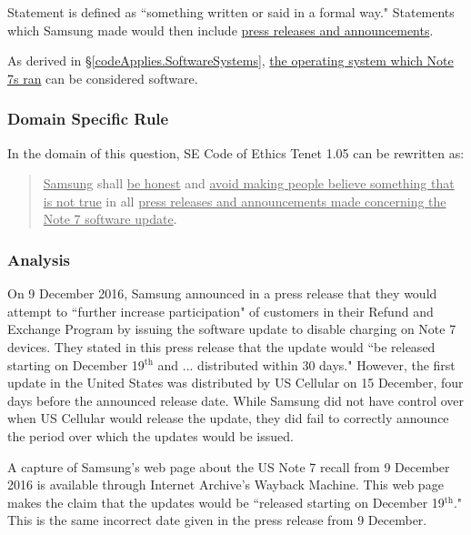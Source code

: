 \documentclass[12pt]{article}
\newcounter{subsubsubsection}[subsubsection]
\begin{document}
	Statement is defined as ``something written or said in a formal way."\cite{merriamDefineStatement} Statements which Samsung made would then include \uline{press releases and announcements}.
      
	As derived in \S\ref{codeApplies.SoftwareSystems}, \uline{the operating system which Note 7s ran} can be considered software.
   
   \subsubsection{Domain Specific Rule}
      In the domain of this question, SE Code of Ethics Tenet 1.05 can be rewritten as:
      
      \begin{quote}
      \uline{Samsung} shall \uline{be honest} and \uline{avoid making people believe something that is not true} in all \uline{press releases and announcements made concerning the Note 7 software update}. 
      \end{quote}
  
   \subsubsection{Analysis}
   \label{1.06 Analysis}
   
      \label{Be Honest}
      On 9 December 2016, Samsung announced in a press release that they would attempt to ``further increase participation" of customers in their Refund and Exchange Program by issuing the software update to disable charging on Note 7 devices\cite{samsungNewsroomUpdateAnnoucement}. They stated in this press release that the update would ``be released starting on December 19$^{\textrm{th}}$ and ... distributed within 30 days."\cite{samsungNewsroomUpdateAnnoucement} However, the first update in the United States was distributed by US Cellular on 15 December, four days before the announced release date\cite{pocketnowNoLongerWorkMessageUSCellular}. While Samsung did not have control over when US Cellular would release the update, they did fail to correctly announce the period over which the updates would be issued\cite{samsungModifiedAndroid}.
      
      A capture of Samsung's web page about the US Note 7 recall from 9 December 2016 is available through Internet Archive's Wayback Machine\cite{waybackmachineRecallNoticeDec9}. This web page makes the claim that the updates would be ``released starting on December 19$^{\textrm{th}}$."\cite{waybackmachineRecallNoticeDec9} This is the same incorrect date given in the press release from 9 December\cite{samsungNewsroomUpdateAnnoucement}.
      
\end{document}
